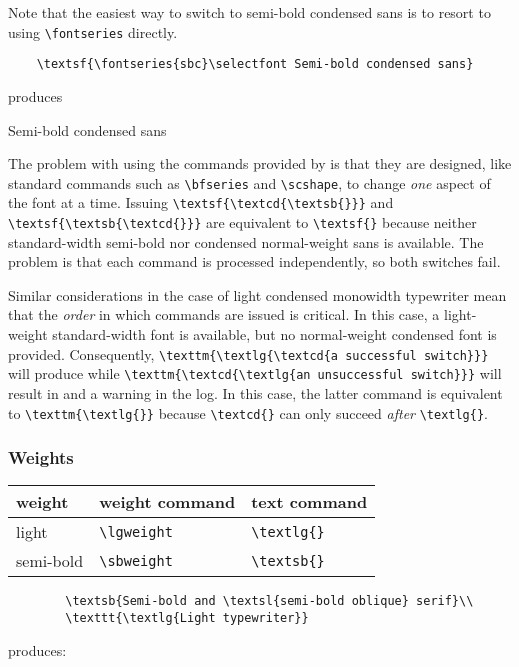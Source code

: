\documentclass[11pt,british,a4paper]{article}
\begin{document}
Note that the easiest way to switch to semi-bold condensed sans is to resort to using \verb|\fontseries| directly.
\begin{verbatim}
	\textsf{\fontseries{sbc}\selectfont Semi-bold condensed sans}
\end{verbatim}
produces
\begin{center}
	\textsf{\selectfont Semi-bold condensed sans}
\end{center}
The problem with using the commands provided by  is that they are designed, like standard commands such as \verb|\bfseries| and \verb|\scshape|, to change \emph{one} aspect of the font at a time. Issuing \verb|\textsf{\textcd{\textsb{}}}| and \verb|\textsf{\textsb{\textcd{}}}| are equivalent to \verb|\textsf{}| because neither standard-width semi-bold nor condensed normal-weight sans is available. The problem is that each command is processed independently, so both switches fail.

Similar considerations in the case of light condensed monowidth typewriter mean that the \emph{order} in which commands are issued is critical. In this case, a light-weight standard-width font is available, but no normal-weight condensed font is provided. Consequently, \verb|\texttm{\textlg{\textcd{a successful switch}}}| will produce  while \verb|\texttm{\textcd{\textlg{an unsuccessful switch}}}| will result in  and a warning in the log. In this case, the latter command is equivalent to \verb|\texttm{\textlg{}}| because \verb|\textcd{}| can only succeed \emph{after} \verb|\textlg{}|.

\subsubsection{Weights}

	\begin{longtable}{lll}
		\toprule
		\textbf{weight}		&	\textbf{weight command}	&	\textbf{text command}\\\midrule\endhead
		\bottomrule\endfoot
		light							&	\verb|\lgweight|				&	\verb|\textlg{}|\\
		semi-bold					&	\verb|\sbweight|				&	\verb|\textsb{}|\\
	\end{longtable}

	\begin{verbatim}
		\textsb{Semi-bold and \textsl{semi-bold oblique} serif}\\
		\texttt{\textlg{Light typewriter}}
	\end{verbatim}
	produces:
	\begin{center}
		\\
		\texttt{}
	\end{center}
\end{document}
